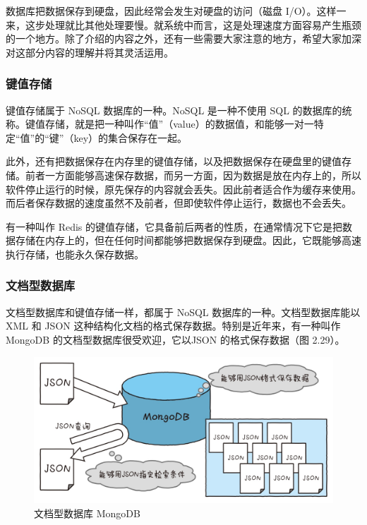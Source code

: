 \documentclass[12pt,UTF8]{ctexbook}
\begin{document}
数据库把数据保存到硬盘，因此经常会发生对硬盘的访问（磁盘 I/O）。这样一来，这步处理就比其他处理要慢。就系统中而言，这是处理速度方面容易产生瓶颈的一个地方。除了介绍的内容之外，还有一些需要大家注意的地方，希望大家加深对这部分内容的理解并将其灵活运用。

\subsubsection{键值存储}

键值存储属于 NoSQL 数据库的一种。NoSQL 是一种不使用 SQL 的数据库的统称。键值存储，就是把一种叫作“值”（value）的数据值，和能够一对一特定“值”的“键”（key）的集合保存在一起。

此外，还有把数据保存在内存里的键值存储，以及把数据保存在硬盘里的键值存储。前者一方面能够高速保存数据，而另一方面，因为数据是放在内存上的，所以软件停止运行的时候，原先保存的内容就会丢失。因此前者适合作为缓存来使用。而后者保存数据的速度虽然不及前者，但即使软件停止运行，数据也不会丢失。

有一种叫作 Redis 的键值存储，它具备前后两者的性质，在通常情况下它是把数据存储在内存上的，但在任何时间都能够把数据保存到硬盘。因此，它既能够高速执行存储，也能永久保存数据。

\subsubsection{文档型数据库}

文档型数据库和键值存储一样，都属于 NoSQL 数据库的一种。文档型数据库能以 XML 和 JSON 这种结构化文档的格式保存数据。特别是近年来，有一种叫作 MongoDB 的文档型数据库很受欢迎，它以JSON 的格式保存数据（图 2.29）。

\begin{figure}[htbp]
	\centering
	\includegraphics[width=1\linewidth]{48}
	\caption{文档型数据库 MongoDB}
	\label{fig:1}
\end{figure}
\end{document}
